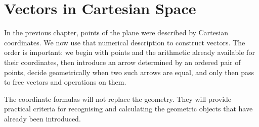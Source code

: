 \section{Vectors in Cartesian Space}

In the previous chapter, points of the plane were described by Cartesian
coordinates. We now use that numerical description to construct vectors. The
order is important: we begin with points and the arithmetic already available
for their coordinates, then introduce an arrow determined by an ordered pair of
points, decide geometrically when two such arrows are equal, and only then pass
to free vectors and operations on them.

The coordinate formulas will not replace the geometry. They will provide
practical criteria for recognising and calculating the geometric objects that
have already been introduced.












